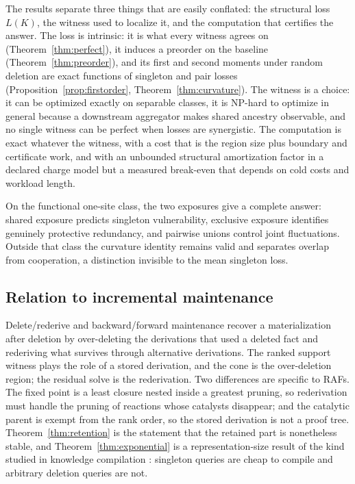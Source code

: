\documentclass[11pt,a4paper]{article}
\theoremstyle{plain}
\theoremstyle{definition}
\theoremstyle{remark}
\begin{document}
The results separate three things that are easily conflated: the structural loss $L(K)$, the witness used to localize it, and the computation that certifies the answer. The loss is intrinsic: it is what every witness agrees on (Theorem~\ref{thm:perfect}), it induces a preorder on the baseline (Theorem~\ref{thm:preorder}), and its first and second moments under random deletion are exact functions of singleton and pair losses (Proposition~\ref{prop:firstorder}, Theorem~\ref{thm:curvature}). The witness is a choice: it can be optimized exactly on separable classes, it is NP-hard to optimize in general because a downstream aggregator makes shared ancestry observable, and no single witness can be perfect when losses are synergistic. The computation is exact whatever the witness, with a cost that is the region size plus boundary and certificate work, and with an unbounded structural amortization factor in a declared charge model but a measured break-even that depends on cold costs and workload length.

On the functional one-site class, the two exposures give a complete answer: shared exposure predicts singleton vulnerability, exclusive exposure identifies genuinely protective redundancy, and pairwise unions control joint fluctuations. Outside that class the curvature identity remains valid and separates overlap from cooperation, a distinction invisible to the mean singleton loss.

\subsection{Relation to incremental maintenance}

Delete/rederive \citep{gupta1993} and backward/forward maintenance \citep{motik2015} recover a materialization after deletion by over-deleting the derivations that used a deleted fact and rederiving what survives through alternative derivations. The ranked support witness plays the role of a stored derivation, and the cone is the over-deletion region; the residual solve is the rederivation. Two differences are specific to RAFs. The fixed point is a least closure nested inside a greatest pruning, so rederivation must handle the pruning of reactions whose catalysts disappear; and the catalytic parent is exempt from the rank order, so the stored derivation is not a proof tree. Theorem~\ref{thm:retention} is the statement that the retained part is nonetheless stable, and Theorem~\ref{thm:exponential} is a representation-size result of the kind studied in knowledge compilation \citep{darwiche2002}: singleton queries are cheap to compile and arbitrary deletion queries are not.
\end{document}
